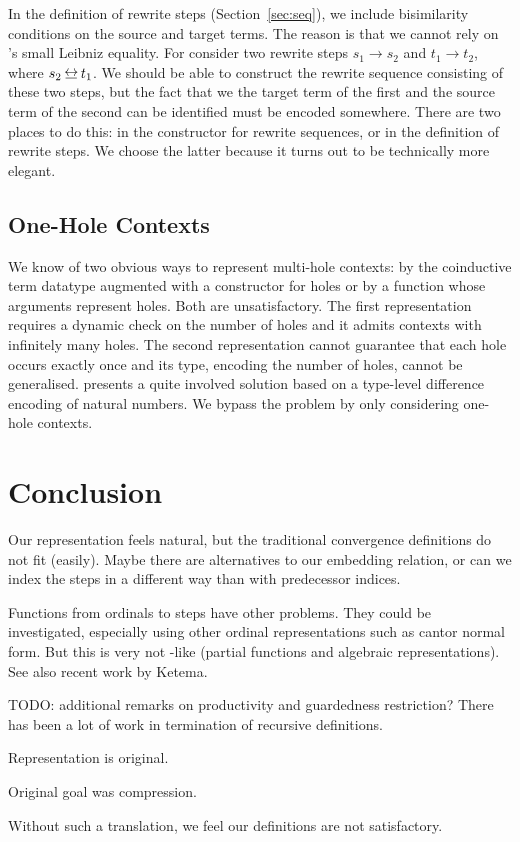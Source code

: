 In the definition of rewrite steps (Section~\ref{sec:seq}), we include
bisimilarity conditions on the source and target terms. The reason is
that we cannot rely on \Coq's small Leibniz equality. For consider two
rewrite steps $s_1 \to s_2$ and $t_1 \to t_2$, where $s_2 \bis
t_1$. We should be able to construct the rewrite sequence consisting
of these two steps, but the fact that we the target term of the first
and the source term of the second can be identified must be encoded
somewhere. There are two places to do this: in the
 constructor
for rewrite sequences, or in the definition of rewrite steps. We
choose the latter because it turns out to be technically more
elegant.


\subsection{One-Hole Contexts}\label{sub:contexts}

We know of two obvious ways to represent multi-hole contexts:
by the coinductive term datatype augmented with a constructor for
holes or by a function whose arguments represent holes.
Both are unsatisfactory. The first representation requires a dynamic
check on the number of holes and it admits contexts with infinitely
many holes. The second representation cannot guarantee
that each hole occurs exactly once and its type, encoding the number of
holes, cannot be generalised. \citet{lindley-08} presents a quite
involved solution based on a type-level difference encoding of natural
numbers. We bypass the problem by only considering one-hole contexts.


\section{Conclusion}

Our representation feels natural, but the traditional convergence
definitions do not fit (easily). Maybe there are alternatives to our
embedding relation, or can we index the steps in a different way than
with predecessor indices.

Functions from ordinals to steps have other problems. They could be
investigated, especially using other ordinal representations such as
cantor normal form. But this is very not \Coq-like (partial functions
and algebraic representations). See also recent work by Ketema.

TODO: additional remarks on productivity and guardedness restriction?
There has been a lot of work in termination of recursive definitions.



Representation is original.

Original goal was compression.

Without such a translation, we feel our definitions are not
satisfactory.
